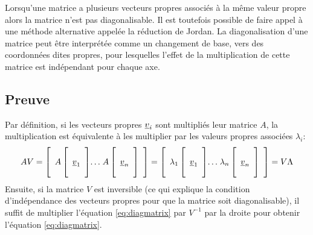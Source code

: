 Lorsqu'une matrice a plusieurs vecteurs propres associés à la même valeur propre alors la matrice n'est pas diagonalisable. Il est toutefois possible de faire appel à une méthode alternative appelée la réduction de Jordan.
%
La diagonalisation d'une matrice peut être interprétée comme un changement de base, vers des coordonnées dites propres, pour lesquelles l'effet de la multiplication de cette matrice est indépendant pour chaque axe.


\subsection{Preuve}
\label{sec:preuvediag}

Par définition, si les vecteurs propres $\underline{v}_i$ sont multipliés leur matrice $A$, la multiplication est équivalente à les multiplier par les valeurs propres associées $\lambda_i$:
%
\begin{align}
	A V =
	\left[ \begin{array}{c@{}c@{}c}
			   A \left[   \begin{array}{c}  \\ \underline{v}_1 \\ \\ \end{array} \right] &  \ldots & \; A \left[  \begin{array}{c} \\ \underline{v}_n \\ \\ \end{array} \right]
	\end{array} \right]
	=
	\left[ \begin{array}{c@{}c@{}c}
			   \lambda_1 \left[   \begin{array}{c}  \\ \underline{v}_1 \\ \\ \end{array} \right] &  \ldots & \;\lambda_n \left[  \begin{array}{c} \\  \underline{v}_n \\ \\ \end{array} \right]
	\end{array} \right]
	= V \Lambda
\end{align}
\label{eq:diagproof}
Ensuite, si la matrice $V$ est inversible (ce qui explique la condition d'indépendance des vecteurs propres pour que la matrice soit diagonalisable), il suffit de multiplier l'équation \eqref{eq:diagmatrix} par $V^{-1}$ par la droite pour obtenir l'équation \eqref{eq:diagmatrix}.




